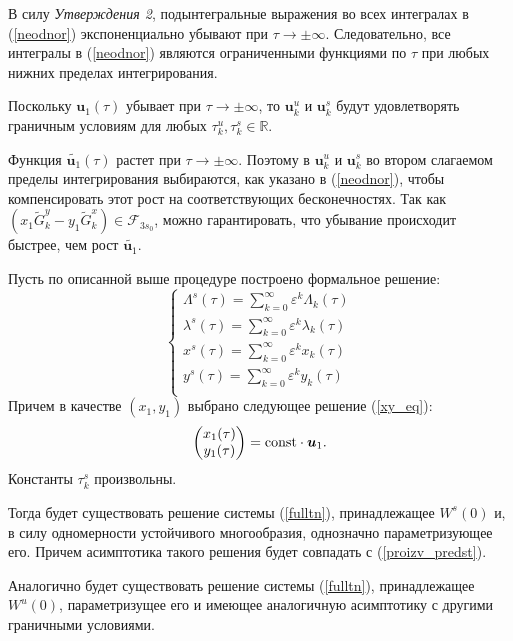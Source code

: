 В силу \textit{Утверждения 2}, подынтегральные выражения во всех интегралах в (\ref{neodnor}) экспоненциально убывают при $\tau \rightarrow \pm \infty$. Следовательно, все интегралы в (\ref{neodnor}) являются ограниченными функциями по $\tau$ при любых нижних пределах интегрирования.

Поскольку $\mathbf{u}_1(\tau)$ убывает при $\tau \rightarrow \pm \infty$, то $\mathbf{u}_k^u$ и $\mathbf{u}_k^s$ будут удовлетворять граничным условиям для любых $\tau^u_k, \tau^s_k \in \mathbb{R}$.

Функция $\tilde{\mathbf{u}_1}(\tau)$ растет при $\tau \rightarrow \pm \infty$. Поэтому в $\mathbf{u}_k^u$ и $\mathbf{u}_k^s$ во втором слагаемом пределы интегрирования выбираются, как указано в (\ref{neodnor}), чтобы компенсировать этот рост на соответствующих бесконечностях. Так как $(x_1 \tilde G_k^y - y_1 \tilde G_k^x) \in \mathcal{F}_{3s_0}$, можно гарантировать, что убывание происходит быстрее, чем рост $\tilde{\mathbf{u}_1}$.

\begin{utv}
Пусть по описанной выше процедуре построено формальное решение:
\begin{equation}
    \begin{cases}
\Lambda^s(\tau) = \sum_{k=0}^\infty \varepsilon^k \Lambda_k(\tau)\\
\lambda^s(\tau) = \sum_{k=0}^\infty \varepsilon^k \lambda_k(\tau)\\
x^s(\tau) =       \sum_{k=0}^\infty \varepsilon^k x_k(\tau)\\
y^s(\tau) =       \sum_{k=0}^\infty \varepsilon^k y_k(\tau)\\
\end{cases}
\label{proizv_predst}
\end{equation}
Причем в качестве $(x_1,y_1)$ выбрано следующее решение (\ref{xy_eq}):
\begin{align*}
    \begin{pmatrix} x_1(\tau) \\ y_1(\tau) \end{pmatrix} = \text{const} \cdot \boldsymbol{u}_1.
\end{align*}
Константы $\tau_k^{s}$ произвольны.

Тогда будет существовать решение системы (\ref{fulltn}), принадлежащее $W^s(0)$ и, в силу одномерности устойчивого многообразия, однозначно параметризующее его.
Причем асимптотика такого решения будет совпадать с (\ref{proizv_predst}).

Аналогично будет существовать решение системы (\ref{fulltn}), принадлежащее $W^u(0)$, параметризущее его и имеющее аналогичную асимптотику с другими граничными условиями.

\end{utv}

